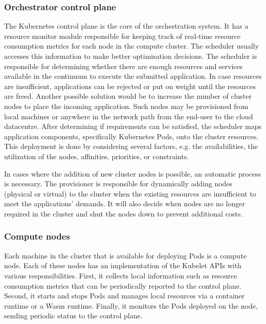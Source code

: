 \subsubsection{Orchestrator control plane}

The Kubernetes control plane is the core of the orchestration system. It has a resource monitor module responsible for keeping track of real-time resource consumption metrics for each node in the compute cluster. The scheduler usually accesses this information to make better optimisation decisions. The scheduler is responsible for determining whether there are enough resources and services available in the continuum to execute the submitted application. In case resources are insufficient, applications can be rejected or put on weight until the resources are freed. Another possible solution would be to increase the number of cluster nodes to place the incoming application. Such nodes may be provisioned from local machines or anywhere in the network path from the end-user to the cloud datacentre. After determining if requirements can be satisfied, the scheduler maps application components, specifically Kubernetes Pods, onto the cluster resources. This deployment is done by considering several factors, e.g. the availabilities, the utilization of the nodes, affinities, priorities, or constraints.

In cases where the addition of new cluster nodes is possible, an automatic process is necessary. The provisioner is responsible for dynamically adding nodes (physical or virtual) to the cluster when the existing resources are insufficient to meet the applications' demands. It will also decide when nodes are no longer required in the cluster and shut the nodes down to prevent additional costs.

\subsubsection{Compute nodes}

Each machine in the cluster that is available for deploying Pods is a compute node. Each of these nodes has an implementation of the Kubelet APIs with various responsibilities. First, it collects local information such as resource consumption metrics that can be periodically reported to the control plane. Second, it starts and stops Pods and manages local resources via a container runtime or a Wasm runtime. Finally, it monitors the Pods deployed on the node, sending periodic status to the control plane.


